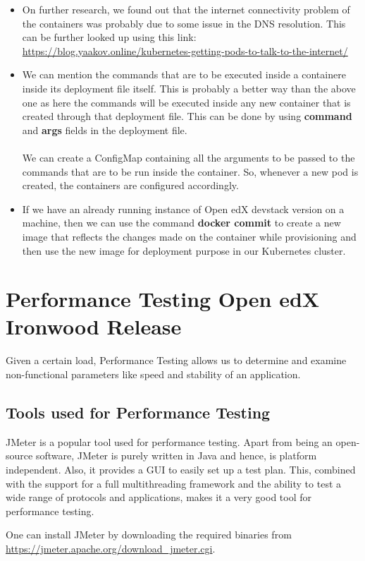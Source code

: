 \documentclass[12pt]{report}
\begin{document}
\begin{itemize}
	\item On further research, we found out that the internet connectivity problem of the containers was probably due to some issue in the DNS resolution. This can be further looked up using this link: \href{https://blog.yaakov.online/kubernetes-getting-pods-to-talk-to-the-internet/}{https://blog.yaakov.online/kubernetes-getting-pods-to-talk-to-the-internet/}\cite{DNS}
	\item We can mention the commands that are to be executed inside a containere inside its deployment file itself. This is probably a better way than the above one as here the commands will be executed inside any new container that is created through that deployment file. This can be done by using \textbf{command} and \textbf{args} fields in the deployment file.\\\\
	We can create a ConfigMap containing all the arguments to be passed to the commands that are to be run inside the container. So, whenever a new pod is created, the containers are configured accordingly.\cite{Configmap}
	\item If we have an already running instance of Open edX devstack version on a machine, then we can use the command \textbf{docker commit} to create a new image that reflects the changes made on the container while provisioning and then use the new image for deployment purpose in our Kubernetes cluster.
\end{itemize}
\chapter{Performance Testing Open edX Ironwood Release}
Given a certain load, Performance Testing allows us to determine and examine non-functional parameters like speed and stability of an application.
\par
\section{Tools used for Performance Testing}
JMeter is a popular tool used for performance testing. Apart from being an open-source software, JMeter is purely written in Java and hence, is platform independent. Also, it provides a GUI to easily set up a test plan. This, combined with the support for a full multithreading framework and the ability to test a wide range of protocols and applications, makes it a very good tool for performance testing.
\par
One can install JMeter by downloading the required binaries from
\\
\url{https://jmeter.apache.org/download_jmeter.cgi}.
\par
\end{document}
